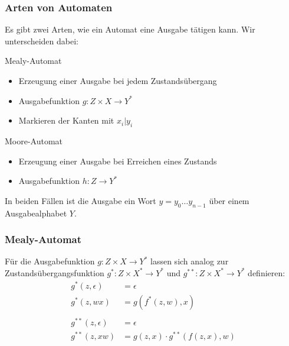 \begin{frame}
  \frametitle{Arten von Automaten}

  Es gibt zwei Arten, wie ein Automat eine Ausgabe tätigen kann. Wir unterscheiden dabei:
  \pause
  \begin{block}{Mealy-Automat}
    \begin{itemize}
      \item Erzeugung einer Ausgabe bei jedem Zustandsübergang
      \item Ausgabefunktion $g: Z \times X \rightarrow Y^*$
      \item Markieren der Kanten mit $x_i|y_i$
    \end{itemize}
   \end{block}
    \pause
   \begin{block}{Moore-Automat}
    \begin{itemize}
      \item Erzeugung einer Ausgabe bei Erreichen eines Zustands
      \item Ausgabefunktion $h: Z \rightarrow Y^*$
    \end{itemize}
  \end{block}

  In beiden Fällen ist die Ausgabe ein Wort $y = y_0\ldots y_{n-1}$ über einem
  Ausgabealphabet $Y$.
\end{frame}

\begin{frame}
	\frametitle{Mealy-Automat}
	Für die Ausgabefunktion $g: Z \times X \rightarrow Y^*$ lassen sich analog zur Zustandsübergangsfunktion $g^*:Z \times X^* \rightarrow Y^*$ und $g^{**}:Z \times X^* \rightarrow Y^*$ definieren:
		\begin{align*}
		  g^{*}(z,\epsilon) &= \epsilon \\
		  g^{*}(z,wx) &= g(f^*(z,w),x) \\ \\
		  g^{**}(z,\epsilon) &= \epsilon \\
		  g^{**}(z,xw) &= g(z,x)\cdot g^{**}(f(z,x),w)
		\end{align*}

\end{frame}

